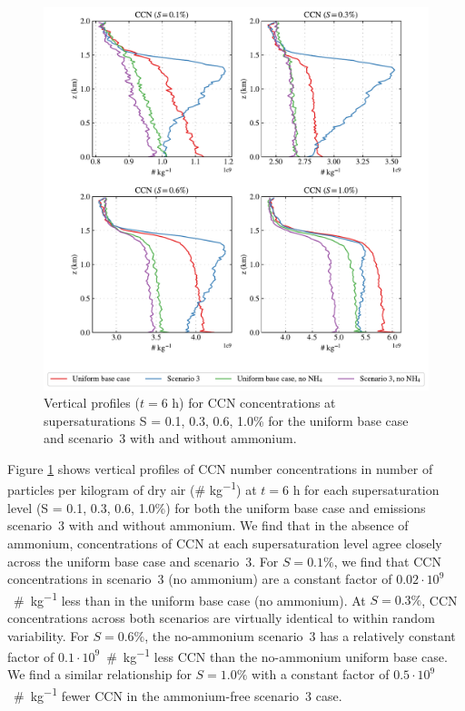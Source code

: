 \begin{figure}[!t]
  \centering
    \includegraphics[width=\textwidth]{figures/chapter5/aerosol-ccn-vertical-profiles-no-nh4-cases-time36.pdf}
    \caption{Vertical profiles ($t = 6$ h) for CCN concentrations at supersaturations S = 0.1, 0.3, 0.6, 1.0\% for the uniform base case and scenario~3 with and without ammonium.}
    \label{fig:vert-profiles-ccn-no-nh4}
\end{figure}

Figure \ref{fig:vert-profiles-ccn-no-nh4} shows vertical profiles of CCN number concentrations in number of particles per kilogram of dry air (\# \si{kg^{-1}}) at $t=6$ h for each supersaturation level (S = 0.1, 0.3, 0.6, 1.0\%) for both the uniform base case and emissions scenario~3 with and without ammonium. We find that in the absence of ammonium, concentrations of CCN at each supersaturation level agree closely across the uniform base case and scenario~3. For $S=0.1\%$, we find that CCN concentrations in scenario~3 (no ammonium) are a constant factor of $0.02\cdot10^{9}$~\#~\si{kg^{-1}} less than in the uniform base case (no ammonium). At $S=0.3\%$, CCN concentrations across both scenarios are virtually identical to within random variability. For $S=0.6\%$, the no-ammonium scenario~3 has a relatively constant factor of $0.1\cdot10^{9}$~\#~\si{kg^{-1}} less CCN than the no-ammonium uniform base case. We find a similar relationship for $S=1.0\%$ with a constant factor of $0.5\cdot10^{9}$~\#~\si{kg^{-1}} fewer CCN in the ammonium-free scenario~3 case. 

